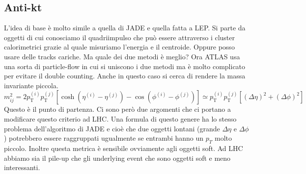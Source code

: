 \documentclass[11pt]{article}
\begin{document}
\subsection{Anti-kt}
L'idea di base è molto simile a quella di JADE e quella fatta a LEP. Si parte da oggetti di cui conosciamo il quadriimpulso che può essere attraverso i cluster calorimetrici grazie al quale misuriamo l'energia e il centroide. Oppure posso usare delle tracks cariche. Ma quale dei due metodi è meglio? Ora ATLAS usa una sorta di particle-flow in cui si uniscono i due metodi ma è molto complicato per evitare il double counting. Anche in questo caso si cerca di rendere la massa invariante piccola.
\begin{equation}
    m_{ij}^2 = 2p_{\mathrm{T}}^{(i)} p_{\mathrm{T}}^{(j)} \left[ \cosh(\eta^{(i)} - \eta^{(j)}) - \cos(\phi^{(i)} - \phi^{(j)}) \right] \simeq p_{\mathrm{T}}^{(i)} p_{\mathrm{T}}^{(j)} \left[ (\Delta\eta)^2 + (\Delta\phi)^2 \right]
\end{equation}
Questo è il punto di partenza. Ci sono però due argomenti che ci portano a modificare questo criterio ad LHC. Una formula di questo genere ha lo stesso problema dell'algoritmo di JADE e cioè che due oggetti lontani (grande $\Delta \eta$ e $\Delta \phi$) potrebbero essere raggruppati ugualmente se entrambi hanno un $p_T$ molto piccolo. Inoltre questa metrica è sensibile ovviamente agli oggetti soft. Ad LHC abbiamo sia il pile-up che gli underlying event che sono oggetti soft e meno interessanti.
\end{document}
